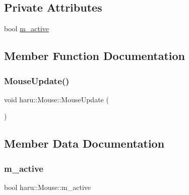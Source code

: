 \subsection*{Private Attributes}
\begin{DoxyCompactItemize}
\item 
bool \mbox{\hyperlink{classharu_1_1_mouse_a617704c4c1df5cc055a4d1f2a1414c70}{m\+\_\+active}}
\end{DoxyCompactItemize}


\subsection{Member Function Documentation}
\mbox{\label{classharu_1_1_mouse_aa12b9821aa46840a997fdfb3e32ddd1e}} 
\subsubsection{\texorpdfstring{Mouse\+Update()}{MouseUpdate()}}
{\footnotesize\ttfamily void haru\+::\+Mouse\+::\+Mouse\+Update (\begin{DoxyParamCaption}{ }\end{DoxyParamCaption})}



\subsection{Member Data Documentation}
\mbox{\label{classharu_1_1_mouse_a617704c4c1df5cc055a4d1f2a1414c70}} 
\subsubsection{\texorpdfstring{m\+\_\+active}{m\_active}}
{\footnotesize\ttfamily bool haru\+::\+Mouse\+::m\+\_\+active\hspace{0.3cm}{\ttfamily [private]}}

\mbox{\label{classharu_1_1_mouse_ab3f417bf9a76505b33efcaff97465e71}} 
